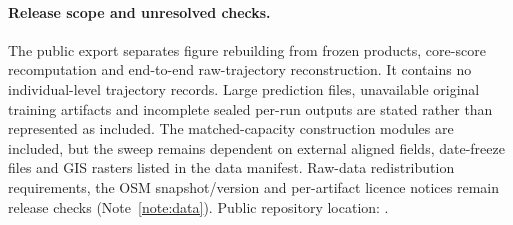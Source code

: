 \paragraph{Release scope and unresolved checks.} The public export separates figure rebuilding from frozen products, core-score recomputation and end-to-end raw-trajectory reconstruction. It contains no individual-level trajectory records. Large prediction files, unavailable original training artifacts and incomplete sealed per-run outputs are stated rather than represented as included. The matched-capacity construction modules are included, but the sweep remains dependent on external aligned fields, date-freeze files and GIS rasters listed in the data manifest. Raw-data redistribution requirements, the OSM snapshot/version and per-artifact licence notices remain release checks (Note~\ref{note:data}). Public repository location: \repositorylocation.
